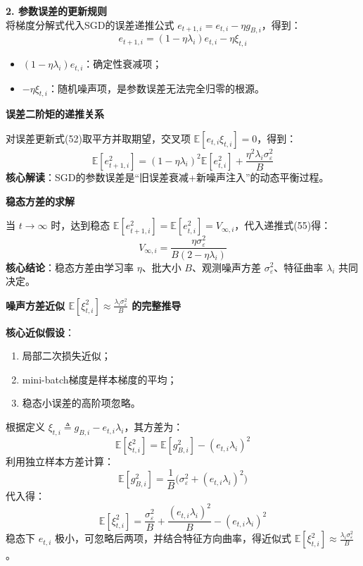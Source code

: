 \documentclass[10pt]{article}
\numberwithin{equation}{section}
\theoremstyle{plain}
\theoremstyle{definition}
\theoremstyle{remark}
\begin{document}
\textbf{2. 参数误差的更新规则}\\
将梯度分解式代入SGD的误差递推公式 $e_{t+1,i} = e_{t,i} - \eta g_{B,i}$，得到：
\[ \displaystyle e_{t+1,i} = (1 - \eta\lambda_i)e_{t,i} - \eta\xi_{t,i} \tag{52} \]
\begin{itemize}[leftmargin=*,nosep]
    \item $(1 - \eta\lambda_i)e_{t,i}$：确定性衰减项；
    \item $-\eta\xi_{t,i}$：随机噪声项，是参数误差无法完全归零的根源。
\end{itemize}

{\par\vspace{0.8ex}\noindent\normalsize\bfseries\color{secblue} 误差二阶矩的递推关系\par}
对误差更新式(52)取平方并取期望，交叉项 $\mathbb{E}[e_{t,i}\xi_{t,i}] = 0$，得到：
\[ \displaystyle \mathbb{E}[e_{t+1,i}^2] = (1 - \eta\lambda_i)^2\mathbb{E}[e_{t,i}^2] + \frac{\eta^2\lambda_i\sigma_\varepsilon^2}{B} \tag{55} \]
\textbf{核心解读}：SGD的参数误差是“旧误差衰减+新噪声注入”的动态平衡过程。

{\par\vspace{0.8ex}\noindent\normalsize\bfseries\color{secblue} 稳态方差的求解\par}
当 $t \to \infty$ 时，达到稳态 $\mathbb{E}[e_{t+1,i}^2] = \mathbb{E}[e_{t,i}^2] = V_{\infty,i}$，代入递推式(55)得：
\[ \displaystyle V_{\infty,i} = \frac{\eta\sigma_\varepsilon^2}{B(2 - \eta\lambda_i)} \tag{57} \]
\textbf{核心结论}：稳态方差由学习率 $\eta$、批大小 $B$、观测噪声方差 $\sigma_\varepsilon^2$、特征曲率 $\lambda_i$ 共同决定。

{\par\vspace{0.8ex}\noindent\normalsize\bfseries\color{secblue} 噪声方差近似 $\mathbb{E}[\xi_{t,i}^2] \approx \frac{\lambda_i\sigma_\varepsilon^2}{B}$ 的完整推导\par}
\textbf{核心近似假设}：
\begin{enumerate}[label=\arabic*., leftmargin=*]
    \item 局部二次损失近似；
    \item mini-batch梯度是样本梯度的平均；
    \item 稳态小误差的高阶项忽略。
\end{enumerate}

\begin{AnalysisBox}[推导过程]
根据定义 $\xi_{t,i} \triangleq g_{B,i} - e_{t,i}\lambda_i$，其方差为：
\[ \displaystyle \mathbb{E}[\xi_{t,i}^2] = \mathbb{E}[g_{B,i}^2] - (e_{t,i}\lambda_i)^2 \]
利用独立样本方差计算：
\[ \displaystyle \mathbb{E}[g_{B,i}^2] = \frac{1}{B}\big(\sigma_\varepsilon^2 + (e_{t,i}\lambda_i)^2\big) \]
代入得：
\[ \displaystyle \mathbb{E}[\xi_{t,i}^2] = \frac{\sigma_\varepsilon^2}{B} + \frac{(e_{t,i}\lambda_i)^2}{B} - (e_{t,i}\lambda_i)^2 \]
稳态下 $e_{t,i}$ 极小，可忽略后两项，并结合特征方向曲率，得近似式 $\displaystyle \mathbb{E}[\xi_{t,i}^2] \approx \frac{\lambda_i \sigma_\varepsilon^2}{B}$。
\end{AnalysisBox}
\end{document}
